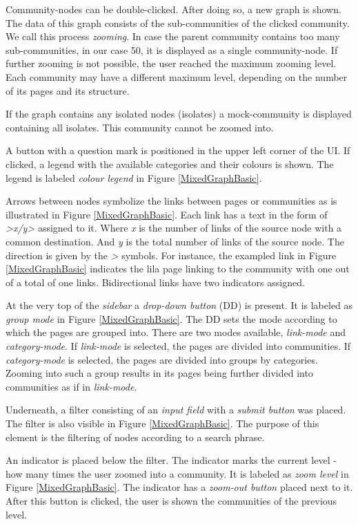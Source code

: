 Community-nodes can be double-clicked. After doing so, a new graph is shown. The data of this graph consists of the sub-communities of the clicked community. We call this process \textit{zooming}. In case the parent community contains too many sub-communities, in our case 50, it is displayed as a single community-node. If further zooming is not possible, the user reached the maximum zooming level. Each community may have a different maximum level, depending on the number of its pages and its structure.

If the graph contains any isolated nodes (isolates) a mock-community is displayed containing all isolates. This community cannot be zoomed into. 

A button with a question mark is positioned in the upper left corner of the UI. If clicked, a legend with the available categories and their colours is shown. The legend is labeled \textit{colour legend} in Figure \ref{MixedGraphBasic}.

Arrows between nodes symbolize the links between pages or communities as is illustrated in Figure \ref{MixedGraphBasic}. Each link has a text in the form of \textit{>x/y>} assigned to it. Where \textit{x} is the number of links of the source node with a common destination. And \textit{y} is the total number of links of the source node. The direction is given by the \textit{>} symbols. For instance, the exampled link in Figure \ref{MixedGraphBasic} indicates the lila page linking to the community with one out of a total of one links. Bidirectional links have two indicators assigned.

At the very top of the \textit{sidebar} a \textit{drop-down button} (DD) is present. It is labeled as \textit{group mode} in Figure \ref{MixedGraphBasic}. The DD sets the mode according to which the pages are grouped into. There are two modes available, \textit{link-mode} and \textit{category-mode}. If \textit{link-mode} is selected, the pages are divided into communities. If \textit{category-mode} is selected, the pages are divided into groups by categories. Zooming into such a group results in its pages being further divided into communities as if in \textit{link-mode}. 

Underneath, a filter consisting of an \textit{input field} with a \textit{submit button} was placed. The filter is also visible in Figure \ref{MixedGraphBasic}. The purpose of this element is the filtering of nodes according to a search phrase.

An indicator is placed below the filter. The indicator marks the current level - how many times the user zoomed into a community. It is labeled as \textit{zoom level} in Figure \ref{MixedGraphBasic}. The indicator has a \textit{zoom-out button} placed next to it. After this button is clicked, the user is shown the communities of the previous level.

